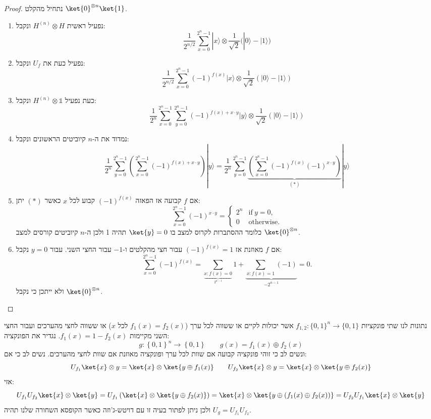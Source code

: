 \documentclass{tstextbook}
\begin{document}
\begin{proof}
נתחיל מהקלט \(\ket{0}^{\otimes n}\ket{1}\). 

  \begin{enumerate}
    \item נפעיל ראשית \(H^{(n)}\otimes H\) ונקבל: 
$${\frac{1}{2^{n/2}}}\sum_{x=0}^{2^{n}-1}|x\rangle\otimes{\frac{1}{\sqrt{2}}}{\big(}|0\rangle-|1\rangle{\big)}$$


    \item נפעיל כעת את \(U_{f}\) ונקבל: 
$${\frac{1}{2^{n/2}}}\sum_{x=0}^{2^{n}-1}(-1)^{f(x)}|x\rangle\otimes{\frac{1}{\sqrt{2}}}(|0\rangle-|1\rangle)$$


    \item כעת נפעיל \(H^{(n)}\otimes \mathbb{1}\) ונקבל: 
$${\frac{1}{2^{n}}}\sum_{x=0}^{2^{n}-1}\sum_{y=0}^{2^{n}-1}(-1)^{f(x)+x\cdot y}|y\rangle\otimes{\frac{1}{\sqrt{2}}}(|0\rangle-|1\rangle)$$


    \item נמדוד את ה-\(n\) קיוביטים הראשונים ונקבל: 
$${\frac{1}{2^{n}}}\sum_{y=0}^{2^{n}-1}{ \left(\sum_{x=0}^{2^{n}-1}(-1)^{f(x)+x\cdot y}\right) }|y\rangle={\frac{1}{2^{n}}}\sum_{y=0}^{2^{n}-1}\underbrace{ \left(\sum_{x=0}^{2^{n}-1}(-1)^{f(x)}(-1)^{x\cdot y}\right) }_{ (*) }|y\rangle$$


    \item אם \(f\) קבועה אז הפאזה \((-1)^{f(x)}\) קבוע לכל \(x\) כאשר \((*)\) יתן: 
$$\sum_{x=0}^{2^{n}-1}(-1)^{x\cdot y}={\begin{cases}2^{n}&{\mathrm{if~}}y=0,\\ 0&{\mathrm{otherwise.}}\end{cases}}$$
כלומר ההסתברות לקרוס למצב בו \(\ket{y}=0\) תהיה 1 ולכן ה-\(n\) קיוביטים קורסים למצב \(\ket{0}^{\otimes n}\).


    \item אם \(f\) מאוזנת אז \((-1)^{f(x)}=1\) עבור חצי מהקלטים ו-\(-1\) עבור החצי השני. עבור \(y=0\) נקבל: 
$$\sum_{x=0}^{2^{n}-1}(-1)^{f(x)}=\sum_{\underbrace{x:f(x)=0}_{2^{n-1}}}1+\underbrace{\sum_{x:f(x)=1}(-1)}_{-2^{n-1}}=0.$$
ולא ייתכן כי נקבל \(\ket{0}^{\otimes n}\). 


  \end{enumerate}
\end{proof}
\begin{example}
נתונות לנו שתי פונקציות \(f_{1,2}:\{0,1\}^{n}\rightarrow\{0,1\}\) אשר יכולות לקיים או ששווה לכל ערך (\(f_{1}(x)=f_{2}(x)\) לכל \(x\)) או ששווה לחצי מהערכים ועבור החצי השני מקיימות \(f_{1}(x)=1-f_{2}(x)\). נגדיר את הפונקציה:
$$g:\left\{0,1\right\}^{n}\longrightarrow\left\{0,1\right\}\qquad g\left(x\right)=f_{1}\left(x\right)\oplus f_{2}\left(x\right)$$
ונשים לב כי זוהי פונקציה קבועה אם שוות לכל ערך ופונקציה מאוזנת אם שוות לחצי מהערכים. נשים לב כי אם:
$$U_{f_1}\ket{x}\otimes y =\ket{x} \otimes \ket{y\oplus f_{1}(x)}\qquad U_{f_2}\ket{x}\otimes y =\ket{x} \otimes \ket{y\oplus f_{2}(x)} $$
אזי:
$$U_{f_1}U_{f_2}\ket{x} \otimes \ket{y} =U_{f_1}\left( \ket{x} \otimes \ket{y\oplus f_{2}(x)}  \right)=\ket{x} \otimes \ket{y \oplus\left( f_{1}(x)\oplus f_{2}(x) \right)}=U_{f_2}U_{f_1}\ket{x} \otimes \ket{y}  $$
ולכן ניתן לפתור בעיה זו עם דויטש-ג'וזה כאשר הקופסא השחורה שלנו תהיה \(U_{g}=U_{f_{1}}U_{f_{2}}\).

\end{example}
\end{document}

